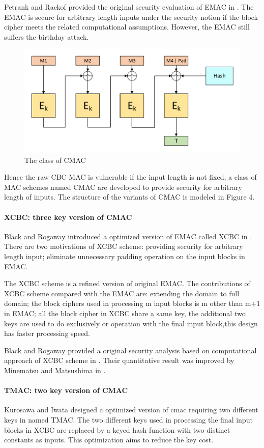 \documentclass{article}
\begin{document}
Petrank and Rackof provided the original security evaluation of EMAC in \cite{emac}. The EMAC is secure for arbitrary length inputs under the security notion if the block cipher meets the related computational assumptions. However, the EMAC still suffers the birthday attack.

\begin{figure}[htbp]
\centering
\includegraphics[scale=0.5]{./diagrams/cmac.pdf}
\caption{The class of CMAC}
\label{CMAC }
\end{figure}
Hence the raw CBC-MAC is vulnerable if the input length is not fixed, a class of MAC schemes named CMAC are developed to provide security for arbitrary length of inputs. The structure of the  variants of CMAC is modeled in Figure 4.
\paragraph{XCBC: three key version of CMAC }
Black and Rogaway introduced a optimized version of EMAC called XCBC in \cite{xcbc}.
There are two motivations of XCBC scheme: providing security for arbitrary length input; eliminate unnecessary padding operation on the input blocks in EMAC.

The XCBC scheme is a refined version of original EMAC. The contributions of XCBC scheme compared with the EMAC are: extending the domain to full domain; the block ciphers used in processing m input blocks is m other than m+1 in EMAC; all the block cipher in XCBC share a same key, the additional two keys are used to do exclusively or operation with the final input block,this design has faster processing speed.   

Black and Rogaway provided a original security analysis based on computational approach of XCBC scheme in \cite{xcbc}. Their quantitative result was improved by Minematsu and Matsushima in \cite{new}. 
\paragraph{TMAC: two key version of CMAC}
Kurosawa and Iwata designed a optimized version of cmac requiring two different keys in \cite{tmac} named TMAC.  
The two different keys used in processing the final input blocks in XCBC are replaced by a keyed hash function with two distinct constants as inputs. This optimization aims to reduce the key cost. 
\end{document}
